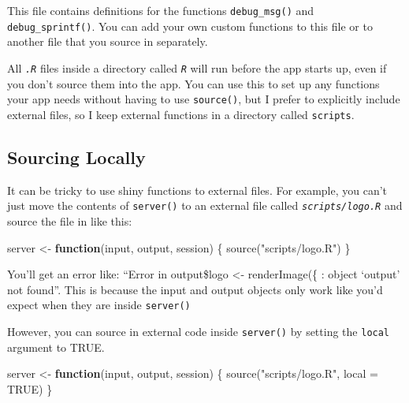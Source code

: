 \documentclass[
  oneside]{book}
\newenvironment{Shaded}{\begin{snugshade}}{\end{snugshade}}
\newcommand{\AttributeTok}[1]{\textcolor[rgb]{0.77,0.63,0.00}{#1}}
\newcommand{\ConstantTok}[1]{\textcolor[rgb]{0.00,0.00,0.00}{#1}}
\newcommand{\ControlFlowTok}[1]{\textcolor[rgb]{0.13,0.29,0.53}{\textbf{#1}}}
\newcommand{\FunctionTok}[1]{\textcolor[rgb]{0.00,0.00,0.00}{#1}}
\newcommand{\NormalTok}[1]{#1}
\newcommand{\OtherTok}[1]{\textcolor[rgb]{0.56,0.35,0.01}{#1}}
\newcommand{\StringTok}[1]{\textcolor[rgb]{0.31,0.60,0.02}{#1}}
\begin{document}
This file contains definitions for the functions \texttt{debug\_msg}\texttt{()} and \texttt{debug\_sprintf}\texttt{()}. You can add your own custom functions to this file or to another file that you source in separately.

\begin{warning}
All \textit{\texttt{.R}} files inside a directory called \textit{\texttt{R}} will run before the app starts up, even if you don't source them into the app. You can use this to set up any functions your app needs without having to use \texttt{source}\texttt{()}, but I prefer to explicitly include external files, so I keep external functions in a directory called \texttt{scripts}.

\end{warning}

\hypertarget{sourcing-locally}{%
\subsection{Sourcing Locally}\label{sourcing-locally}}

It can be tricky to use shiny functions to external files. For example, you can't just move the contents of \texttt{server}\texttt{()} to an external file called \textit{\texttt{scripts/logo.R}} and source the file in like this:

\begin{Shaded}
\begin{Highlighting}[]
\NormalTok{server }\OtherTok{\textless{}{-}} \ControlFlowTok{function}\NormalTok{(input, output, session) \{}
    \FunctionTok{source}\NormalTok{(}\StringTok{"scripts/logo.R"}\NormalTok{)}
\NormalTok{\} }
\end{Highlighting}
\end{Shaded}

You'll get an error like: ``Error in output\$logo \textless- renderImage(\{ : object `output' not found''. This is because the input and output objects only work like you'd expect when they are inside \texttt{server}\texttt{()}

However, you can source in external code inside \texttt{server}\texttt{()} by setting the \texttt{local} argument to TRUE.

\begin{Shaded}
\begin{Highlighting}[]
\NormalTok{server }\OtherTok{\textless{}{-}} \ControlFlowTok{function}\NormalTok{(input, output, session) \{}
    \FunctionTok{source}\NormalTok{(}\StringTok{"scripts/logo.R"}\NormalTok{, }\AttributeTok{local =} \ConstantTok{TRUE}\NormalTok{)}
\NormalTok{\} }
\end{Highlighting}
\end{Shaded}
\end{document}
